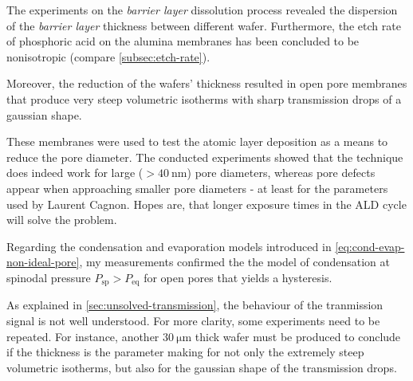 \documentclass[../thesis.tex]{subfiles}
\begin{document}
    The experiments on the \textit{barrier layer} dissolution process revealed the dispersion of the \textit{barrier layer} thickness between different wafer. Furthermore, the etch rate of phosphoric acid on the alumina membranes has been concluded to be nonisotropic (compare \cref{subsec:etch-rate}).

    Moreover, the reduction of the wafers' thickness resulted in open pore membranes that produce very steep volumetric isotherms with sharp transmission drops of a gaussian shape.

    These membranes were used to test the atomic layer deposition as a means to reduce the pore diameter. The conducted experiments showed that the technique does indeed work for large ($>\SI{40}{\nano\meter}$) pore diameters, whereas pore defects appear when approaching smaller pore diameters - at least for the parameters used by Laurent Cagnon. Hopes are, that longer exposure times in the ALD cycle will solve the problem.

    Regarding the condensation and evaporation models introduced in \cref{eq:cond-evap-non-ideal-pore}, my measurements confirmed the the model of condensation at spinodal pressure $P_\mathrm{sp}>P_\mathrm{eq}$ for open pores that yields a hysteresis.
    \medskip

    As explained in \cref{sec:unsolved-transmission}, the behaviour of the tranmission signal is not well understood. For more clarity, some experiments need to be repeated.  For instance, another $\SI{30}{\micro\meter}$ thick wafer must be produced to conclude if the thickness is the parameter making for not only the extremely steep volumetric isotherms, but also for the gaussian shape of the transmission drops.
\end{document}
